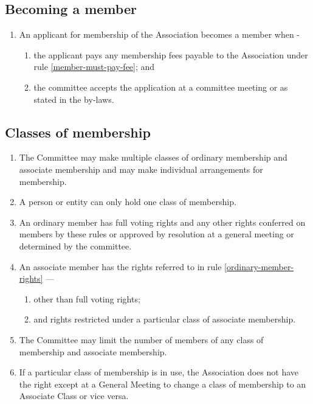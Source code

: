 \documentclass[../constitution.tex]{subfiles}
\begin{document}
\subsection{Becoming a member} \label{becoming-a-member}

\begin{enumerate}
\item An applicant for membership of the Association becomes a member when -
  \begin{enumerate}
  \item the applicant pays any membership fees payable to the Association under rule \ref{member-must-pay-fee}; and
  \item the committee accepts the application at a committee meeting or as stated in the by-laws.
  \end{enumerate}
\end{enumerate}


\subsection{Classes of membership} \label{classes-of-membership}

\begin{enumerate}
\item The Committee may make multiple classes of ordinary membership and associate membership and may make individual arrangements for membership.
\item A person or entity can only hold one class of membership.
\item An ordinary member has full voting rights and any other rights conferred on members by these rules or approved by resolution at a general meeting or determined by the committee. \label{ordinary-member-rights}
\item An associate member has the rights referred to in rule \ref{ordinary-member-rights} ---
  \begin{enumerate}
  \item other than full voting rights;
  \item and rights restricted under a particular class of associate membership.
  \end{enumerate}
\item The Committee may limit the number of members of any class of membership and associate membership.
\item If a particular class of membership is in use, the Association does not have the right except at a General Meeting to change a class of membership to an Associate Class or vice versa.
\end{enumerate}
\end{document}
